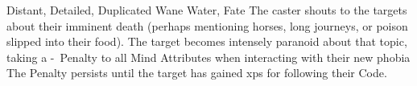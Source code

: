   {Distant, Detailed, Duplicated}%
  {Wane}%
  {Water, Fate}%
  {}%
  {The caster shouts to the targets about their imminent death (perhaps mentioning horses, long journeys, or poison slipped into their food).
    The target becomes intensely paranoid about that topic, taking a -~Penalty to all Mind Attributes when interacting with their new phobia}%
  {
  The Penalty persists until the target has gained  \glspl{xp} for following their Code.}

